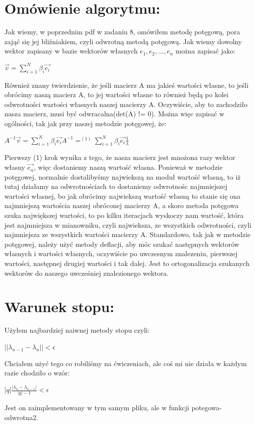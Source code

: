 \documentclass[12pt]{article}
\begin{document}
\section{Omówienie algorytmu: }
Jak wiemy, w poprzednim pdf w zadaniu 8, omówiłem metodę potęgową, pora zająć się jej bliźniakiem, czyli odwrotną metodą potęgową. Jak wiemy dowolny wektor zapisany w bazie wektorów własnych ${e_{1},e_{2},...,e_{n}}$ można zapisać jako:
\begin{center}
    \begin{math}
        \vec{v} = \sum_{i=1}^{N}\beta_{i}\vec{e_{i}}
    \end{math}
\end{center}
Również znany twierdzienie, że jeśli macierz A ma jakieś wartości własne, to jeśli obrócimy naszą macierz A, to jej wartości własne to również będą po kolei odwrotności wartości własnych naszej macierzy A. Oczywiście, aby to zachodziło nasza macierz, musi być odwracalna(det(A) != 0). Można więc zapisać w ogólności, tak jak przy naszej metodzie potęgowej, że:
\begin{center}
    \begin{math}
        A^{-1}\vec{v} = \sum_{i=1}^{N}\beta_{i}\vec{e_{i}}A^{-1} =^{(1)} \sum_{i=1}^{N}\beta_{i}\vec{e_{i}}\frac{1}{\lambda}
    \end{math}
    \end{center}
Pierwszy (1) krok wynika z tego, że nasza macierz jest mnożona razy wektor własny $\vec{e_{n}}$, więc dostaniemy naszą wartość własna. Ponieważ w metodzie potęgowej, normalnie dostalibyśmy najwiekszą na moduł wartość własną, to iż tutaj działamy na odwrotnościach to dostaniemy odwrotnośc najmniejszej wartości własnej, bo jak obrócimy najwiekszą wartość własną to stanie się ona najmniejszą wartościa naszej obróconej macierzy A, a skoro metoda potęgowa szuka największej wartości, to po kilku iteracjach wyskoczy nam wartość, która jest najmniejsza w mianowniku, czyli najwieksza, ze wszystkich odwrotności, czyli najmniejsza ze wszystkich wartości macierzy A. Standardowo, tak jak w metodzie potęgowej, należy użyć metody deflacji, aby móc szukać następnych wektorów własnych i wartości własnych, oczywiście po uwczesnym znalezeniu, pierwszej wartości, następnej drugiej wartości i tak dalej. Jest to ortogonalizacja szukanych wektorów do naszego uwcześniej znalezionego wektora.
\section{Warunek stopu: }
Użyłem najbardziej naiwnej metody stopu czyli:
\begin{center}
    \begin{math}
        ||\lambda_{n-1} - \lambda_{n}|| < \epsilon
    \end{math}
    \end{center}
Chciałem użyć tego co robiliśmy na ćwiczeniach, ale coś mi nie działa w każdym razie chodziło o wzór:
\begin{center}
    \begin{math}
        |q|\frac{|\lambda_{n}-\lambda_{n-1}|}{|q|-1} < \epsilon
    \end{math}
    \end{center}
Jest on zaimplementowany w tym samym pliku, ale w funkcji potegowa-odwrotna2.
\end{document}
